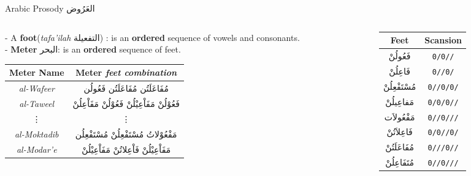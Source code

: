 \begin{frame}[fragile]{Arabic Prosody \textarabic{العَرُوض}}
\begin{columns}
	
	\begin{column}{.7\textwidth} %
		{\small 	
		- A \textbf{foot}(\textit{tafa'ilah} \textarabic{التفعيلة}) : is an \textbf{ordered} sequence of vowels and consonants. \\
		- \textbf{Meter} \textarabic{البحر}: is an \textbf{ordered} sequence of \alert{feet}. }

		\begin{table}
		\small
				\begin{tabular}[h!]{|c|c|} 
			\hline
			\textbf{Meter Name} & \textbf{Meter} \small{\textit{feet combination}} \\ 
			\hline
			\textit{al-Wafeer}    & \textarabic{مُفَاعَلَتُن مُفَاعَلَتُن فَعُولُن} \\ %
			\textit{al-Taweel}    & \textarabic{فَعُوْلُنْ مَفَاْعِيْلُنْ فَعُوْلُنْ مَفَاْعِلُنْ} \\ %
			\vdots                &  \vdots\\
			\textit{al-Moktadib}  & \textarabic{مَفْعُوْلاتُ مُسْتَفْعِلُنْ مُسْتَفْعِلُن} \\
			\textit{al-Modar'e}   & \textarabic{مَفَاْعِيْلُنْ فَاْعِلاتُنْ مَفَاْعِيْلُنْ} \\
			\hline
		\end{tabular}
		\end{table}
	\end{column}%
		\hfill%
		\begin{column}{.3 \textwidth}
			\begin{table}
				\small
			\begin{tabular}{|c|c|} \hline
			\textbf{Feet} & \textbf{Scansion} \\
			\hline
			\textarabic{فَعُولُنْ}  & \texttt{0/0//}\\
			\textarabic{فَاعِلُنْ}  & \texttt{0//0/}\\
			\textarabic{مُسْتَفْعِلُنْ}& \texttt{0//0/0/}\\
			\textarabic{مَفاعِيلُنْ}& \texttt{0/0/0//}\\
			\textarabic{مَفْعُولاَت} & \texttt{0//0///}\\
			\textarabic{فَاعِلاَتُنْ} & \texttt{0/0//0/}\\
			\textarabic{مُفَاعَلَتُنْ}& \texttt{0///0//}\\
			\textarabic{مُتَفَاعِلُنْ}& \texttt{0//0///}\\
			\hline
		\end{tabular}
		\end{table}		


\end{column}
\end{columns}
\end{frame}
